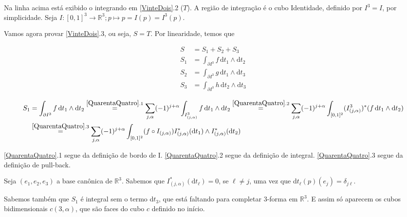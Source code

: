 \documentclass[12pt,a4paper]{article}
\begin{document}
		Na linha acima est\'a exibido o integrando em \ref{VinteDois}.2 ($T$). A regi\~ao de integra\c{c}\~ao \'e o cubo Identidade, definido por $I^3 = I$, por simplicidade. Seja $I : [0,1]^3 \rightarrow \mathbb{R}^3 ; p \mapsto p = I(p) = I^3(p)$.
		
		\begin{flushright}
		\end{flushright}

		Vamos agora provar \ref{VinteDois}.3, ou seja, $S = T$. Por linearidade, temos que
		
		\begin{align}
			S &= S_1 + S_2 + S_3 \\
			S_1 &= \int_{\partial I^3} f \,\mathrm{d}t_1 \wedge \mathrm{d}t_2 \\
			S_2 &= \int_{\partial I^3} g \,\mathrm{d}t_1 \wedge \mathrm{d}t_3 \\
			S_3 &= \int_{\partial I^3} h \,\mathrm{d}t_2 \wedge \mathrm{d}t_3 
		\end{align}		
		
		\begin{align}
			S_1 &= \int_{\partial I^3} f \,\mathrm{d}t_1 \wedge \mathrm{d}t_2 \stackrel{\ref{QuarentaQuatro}.1}{=} \sum_{j, \alpha} (-1)^{j + \alpha} \int_{I^3_{(j, \alpha)}} f \,\mathrm{d}t_1 \wedge \mathrm{d}t_2 \stackrel{\ref{QuarentaQuatro}.2}{=} \sum_{j, \alpha} (-1)^{j + \alpha} \int_{[0,1]^2} (I_{(j, \alpha)}^{3})^* (f \,\mathrm{d}t_1 \wedge \mathrm{d}t_2) \label{QuarentaQuatro} \\
			&\stackrel{\ref{QuarentaQuatro}.3}{=} \sum_{j, \alpha} (-1)^{j + \alpha} \int_{[0,1]^2} (f \circ I_{(j, \alpha)}) I^*_{(j, \alpha)} (\mathrm{d}t_1) \wedge I^*_{(j, \alpha)} (\mathrm{d}t_2)
		\end{align}

		\ref{QuarentaQuatro}.1 segue da defini\c{c}\~ao de bordo de I. \ref{QuarentaQuatro}.2 segue da defini\c{c}\~ao de integral.	\ref{QuarentaQuatro}.3 segue da defini\c{c}\~ao de pull-back.
		
		Seja $(e_1, e_2, e_3)$ a base can\^onica de $\mathbb{R}^3$. Sabemos que $I^*_{(j, \alpha)} (\mathrm{d}t_\ell) = 0$, se $\ell \neq j$, uma vez que d$t_\ell(p)(e_j) = \delta_{j\ell}$.
		
		Sabemos tamb\'em que $S_1$ \'e integral sem o termo d$t_3$, que est\'a faltando para completar 3-forma em $\mathbb{R}^3$. E assim s\'o aparecem os cubos bidimensionais $c(3, \alpha)$, que s\~ao faces do cubo $c$ definido no in\'icio.
\end{document}
